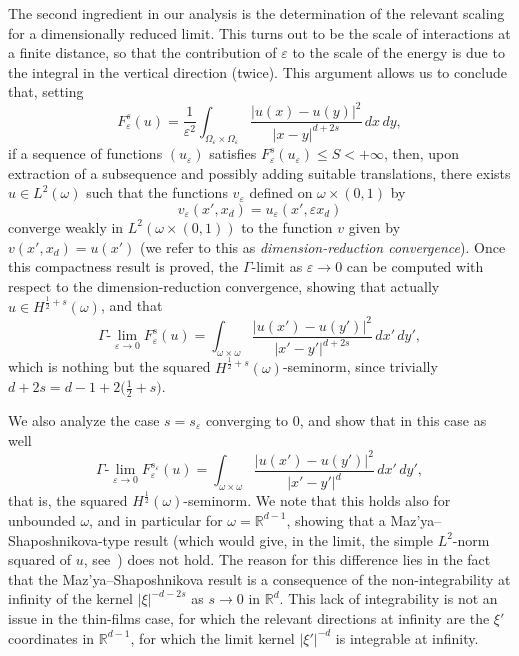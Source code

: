 \documentclass[11pt]{article}
\def\e{\varepsilon}
\begin{document}
The second ingredient in our analysis is the determination of the relevant scaling for a dimensionally reduced limit. This turns out to be the scale of interactions at a finite distance, so that the contribution of $\e$ to the scale of the energy is due to the integral in the vertical direction (twice). This argument allows us to conclude that, setting
\[
F^s_\e(u)= \frac1{\e^2}
\int_{\Omega_\e\times\Omega_\e}
\frac{|u(x)-u(y)|^2}{|x-y|^{d+2s}}\,dx\,dy,
\]
if a sequence of functions $(u_\e)$ satisfies $F^s_\e(u_\e)\le S<+\infty$, then, upon extraction of a subsequence and possibly adding suitable translations, there exists $u\in L^2(\omega)$ such that the functions $v_\e$ defined on $\omega\times(0,1)$ by
\[
v_\e(x',x_d)=u_\e(x',\e x_d)
\]
converge weakly in $L^2(\omega\times(0,1))$ to the function $v$ given by $v(x',x_d)=u(x')$ (we refer to this as {\em dimension-reduction convergence}). Once this compactness result is proved, the $\Gamma$-limit as $\e\to 0$ can be computed with respect to the dimension-reduction convergence, showing that actually $u\in H^{\frac12+s}(\omega)$, and that 
\[
\Gamma\text{-}\lim_{\e\to 0} F^s_\e(u)= \int_{\omega\times\omega}
\frac{|u(x')-u(y')|^2}{|x'-y'|^{d+2s}}\,dx'\,dy',
\]
which is nothing but the squared $H^{\frac12+s}(\omega)$-seminorm, since 
trivially $d+2s= d-1+2\bigl(\tfrac12+s\bigr)$.

We also analyze the case $s=s_\e$ converging to $0$, and show that in this case as well
\[
\Gamma\text{-}\lim_{\e\to 0} F^{s_\e}_\e(u)= \int_{\omega\times\omega}
\frac{|u(x')-u(y')|^2}{|x'-y'|^{d}}\,dx'\,dy',
\]
that is, the squared $H^{\frac12}(\omega)$-seminorm. We note that this holds also for unbounded $\omega$, and in particular for $\omega=\mathbb R^{d-1}$, showing that a Maz'ya--Shaposhnikova-type result (which would give, in the limit, the simple $L^2$-norm squared of $u$, see~\cite{MS}) does not hold. The reason for this difference lies in the fact that the Maz'ya--Shaposhnikova result is a consequence of the non-integrability at infinity of the kernel $|\xi|^{-d-2s}$ as $s\to 0$ in $\mathbb R^d$. This lack of integrability is not an issue in the thin-films case, for which the relevant directions at infinity are the $\xi'$ coordinates in $\mathbb R^{d-1}$, for which the limit kernel $|\xi'|^{-d}$ is integrable at infinity. 
\end{document}
